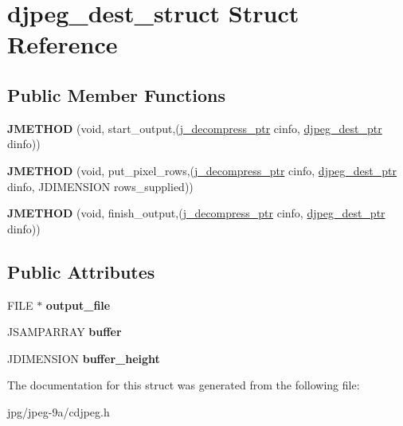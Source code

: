 \hypertarget{structdjpeg__dest__struct}{\section{djpeg\+\_\+dest\+\_\+struct Struct Reference}
\label{structdjpeg__dest__struct}
}
\subsection*{Public Member Functions}
\begin{DoxyCompactItemize}
\item 
\hypertarget{structdjpeg__dest__struct_a387aad15333be251b9fdd4f341e3b50c}{{\bfseries J\+M\+E\+T\+H\+O\+D} (void, start\+\_\+output,(\hyperlink{structjpeg__decompress__struct}{j\+\_\+decompress\+\_\+ptr} cinfo, \hyperlink{structdjpeg__dest__struct}{djpeg\+\_\+dest\+\_\+ptr} dinfo))}\label{structdjpeg__dest__struct_a387aad15333be251b9fdd4f341e3b50c}

\item 
\hypertarget{structdjpeg__dest__struct_ab7452265598106468aeb73b63c080024}{{\bfseries J\+M\+E\+T\+H\+O\+D} (void, put\+\_\+pixel\+\_\+rows,(\hyperlink{structjpeg__decompress__struct}{j\+\_\+decompress\+\_\+ptr} cinfo, \hyperlink{structdjpeg__dest__struct}{djpeg\+\_\+dest\+\_\+ptr} dinfo, J\+D\+I\+M\+E\+N\+S\+I\+O\+N rows\+\_\+supplied))}\label{structdjpeg__dest__struct_ab7452265598106468aeb73b63c080024}

\item 
\hypertarget{structdjpeg__dest__struct_a3a1f7c965ea1dbbb577eb8902e3c893e}{{\bfseries J\+M\+E\+T\+H\+O\+D} (void, finish\+\_\+output,(\hyperlink{structjpeg__decompress__struct}{j\+\_\+decompress\+\_\+ptr} cinfo, \hyperlink{structdjpeg__dest__struct}{djpeg\+\_\+dest\+\_\+ptr} dinfo))}\label{structdjpeg__dest__struct_a3a1f7c965ea1dbbb577eb8902e3c893e}

\end{DoxyCompactItemize}
\subsection*{Public Attributes}
\begin{DoxyCompactItemize}
\item 
\hypertarget{structdjpeg__dest__struct_a5cd2d9d83c2b0b77b30169be5682d8fc}{F\+I\+L\+E $\ast$ {\bfseries output\+\_\+file}}\label{structdjpeg__dest__struct_a5cd2d9d83c2b0b77b30169be5682d8fc}

\item 
\hypertarget{structdjpeg__dest__struct_a84d1443492d9c70afae65d6f95410cf4}{J\+S\+A\+M\+P\+A\+R\+R\+A\+Y {\bfseries buffer}}\label{structdjpeg__dest__struct_a84d1443492d9c70afae65d6f95410cf4}

\item 
\hypertarget{structdjpeg__dest__struct_a78eef05ab5286600c995e9df51acf2c1}{J\+D\+I\+M\+E\+N\+S\+I\+O\+N {\bfseries buffer\+\_\+height}}\label{structdjpeg__dest__struct_a78eef05ab5286600c995e9df51acf2c1}

\end{DoxyCompactItemize}


The documentation for this struct was generated from the following file\+:\begin{DoxyCompactItemize}
\item 
jpg/jpeg-\/9a/cdjpeg.\+h\end{DoxyCompactItemize}
